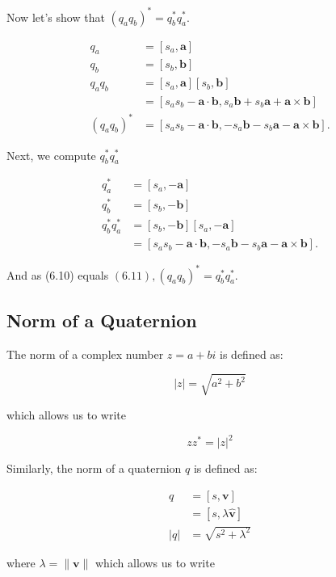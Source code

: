 \documentclass[10pt]{article}
\begin{document}
Now let's show that $\left(q_{a} q_{b}\right)^{*}=q_{b}^{*} q_{a}^{*}$.

$$
\begin{aligned}
q_{a} & =\left[s_{a}, \mathbf{a}\right] \\
q_{b} & =\left[s_{b}, \mathbf{b}\right] \\
q_{a} q_{b} & =\left[s_{a}, \mathbf{a}\right]\left[s_{b}, \mathbf{b}\right] \\
& =\left[s_{a} s_{b}-\mathbf{a} \cdot \mathbf{b}, s_{a} \mathbf{b}+s_{b} \mathbf{a}+\mathbf{a} \times \mathbf{b}\right] \\
\left(q_{a} q_{b}\right)^{*} & =\left[s_{a} s_{b}-\mathbf{a} \cdot \mathbf{b},-s_{a} \mathbf{b}-s_{b} \mathbf{a}-\mathbf{a} \times \mathbf{b}\right] .
\end{aligned}
$$

Next, we compute $q_{b}^{*} q_{a}^{*}$

$$
\begin{aligned}
q_{a}^{*} & =\left[s_{a},-\mathbf{a}\right] \\
q_{b}^{*} & =\left[s_{b},-\mathbf{b}\right] \\
q_{b}^{*} q_{a}^{*} & =\left[s_{b},-\mathbf{b}\right]\left[s_{a},-\mathbf{a}\right] \\
& =\left[s_{a} s_{b}-\mathbf{a} \cdot \mathbf{b},-s_{a} \mathbf{b}-s_{b} \mathbf{a}-\mathbf{a} \times \mathbf{b}\right] .
\end{aligned}
$$

And as (6.10) equals $(6.11),\left(q_{a} q_{b}\right)^{*}=q_{b}^{*} q_{a}^{*}$.

\subsection{Norm of a Quaternion}
The norm of a complex number $z=a+b i$ is defined as:

$$
|z|=\sqrt{a^{2}+b^{2}}
$$

which allows us to write

$$
z z^{*}=|z|^{2}
$$

Similarly, the norm of a quaternion $q$ is defined as:

$$
\begin{aligned}
q & =[s, \mathbf{v}] \\
& =[s, \lambda \hat{\mathbf{v}}] \\
|q| & =\sqrt{s^{2}+\lambda^{2}}
\end{aligned}
$$

where $\lambda=\|\mathbf{v}\|$ which allows us to write
\end{document}
